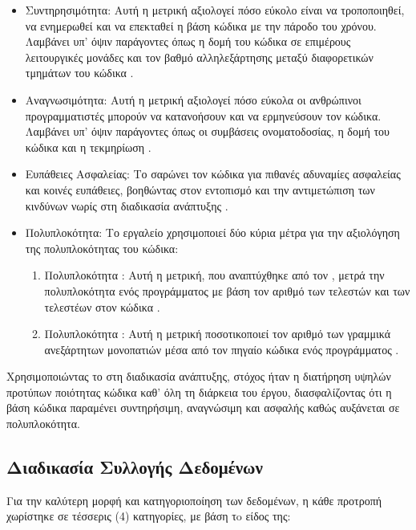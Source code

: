 \begin{itemize}
  \item Συντηρησιμότητα: Αυτή η μετρική αξιολογεί πόσο εύκολο είναι
    να τροποποιηθεί, να ενημερωθεί και να επεκταθεί η βάση κώδικα με
    την πάροδο του χρόνου. Λαμβάνει υπ' όψιν παράγοντες όπως η δομή του
    κώδικα σε επιμέρους λειτουργικές μονάδες και τον βαθμό
    αλληλεξάρτησης μεταξύ διαφορετικών τμημάτων του κώδικα
    \cite{maintainability}.

  \item Αναγνωσιμότητα: Αυτή η μετρική αξιολογεί πόσο εύκολα οι
    ανθρώπινοι προγραμματιστές μπορούν να κατανοήσουν και να
    ερμηνεύσουν τον κώδικα. Λαμβάνει υπ' όψιν παράγοντες όπως οι
    συμβάσεις ονοματοδοσίας, η δομή του κώδικα και η τεκμηρίωση
    \cite{readability}.
  \item Ευπάθειες Ασφαλείας: Το  σαρώνει τον κώδικα για
    πιθανές αδυναμίες ασφαλείας και κοινές ευπάθειες, βοηθώντας στον
    εντοπισμό και την αντιμετώπιση των κινδύνων νωρίς στη διαδικασία
    ανάπτυξης \cite{security_vulnerabilities}.
  \item Πολυπλοκότητα: Το εργαλείο χρησιμοποιεί δύο κύρια μέτρα για
    την αξιολόγηση της πολυπλοκότητας του κώδικα:
    \begin{enumerate}
      \item Πολυπλοκότητα : Αυτή η μετρική, που
        αναπτύχθηκε από τον , μετρά την
        πολυπλοκότητα ενός προγράμματος με βάση τον αριθμό των
        τελεστών και των τελεστέων στον κώδικα \cite{halstead}.
      \item Πολυπλοκότητα   : Aυτή η μετρική ποσοτικοποιεί
        τον αριθμό των
        γραμμικά ανεξάρτητων μονοπατιών μέσα από τον πηγαίο κώδικα
        ενός προγράμματος \cite{mccabe}.
    \end{enumerate}
\end{itemize}
Χρησιμοποιώντας το  στη διαδικασία ανάπτυξης,
στόχος ήταν η διατήρηση υψηλών προτύπων ποιότητας κώδικα καθ' όλη
τη διάρκεια του έργου, διασφαλίζοντας ότι η βάση κώδικα παραμένει
συντηρήσιμη, αναγνώσιμη και ασφαλής καθώς αυξάνεται σε πολυπλοκότητα.
\subsection{Διαδικασία Συλλογής Δεδομένων}

Για την καλύτερη μορφή και κατηγοριοποίηση των δεδομένων, η κάθε
προτροπή χωρίστηκε σε τέσσερις (4) κατηγορίες, με βάση τo είδος της:

